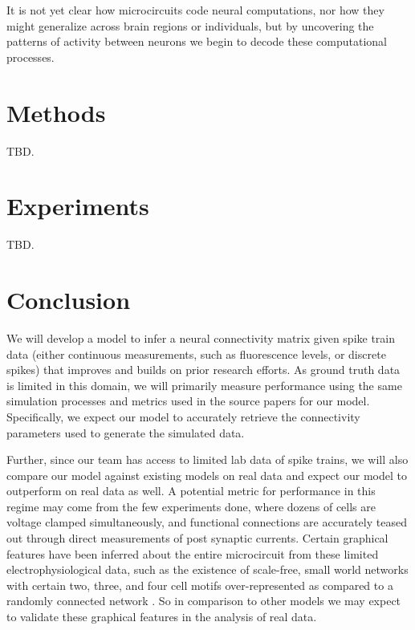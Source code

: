 \documentclass{article}
\begin{document}
It is not yet clear how microcircuits code neural
computations, nor how they might generalize across brain regions
or individuals, but by uncovering the patterns of activity between
neurons we begin to decode these computational processes.

\section{Methods}
TBD.
\section{Experiments}
TBD.

\section{Conclusion}
We will develop a model to infer a neural connectivity matrix given spike train data (either continuous measurements, such as fluorescence levels, or discrete spikes) that improves and builds on prior research efforts. As ground truth data is limited in this domain, we will primarily measure performance using the same simulation processes and metrics used in the source papers for our model.  Specifically, we expect our model to accurately retrieve the connectivity parameters used to generate the simulated data.  

Further, since our team has access to limited lab data of spike trains, we will also compare our model against existing models on real data and expect our model to outperform on real data as well.  A potential metric for performance in this regime may come from the few experiments done, where dozens of cells are voltage clamped simultaneously, and functional connections are accurately teased out through direct measurements of post synaptic currents.  Certain graphical features have been inferred about the entire microcircuit from these limited electrophysiological data, such as the existence of scale-free, small world networks with certain two, three, and four cell motifs over-represented as compared to a randomly connected network \citep{song2005,perin2011}.  So in comparison to other models we may expect to validate these graphical features in the analysis of real data.

\begin{small}

 
\end{small}
\end{document}
